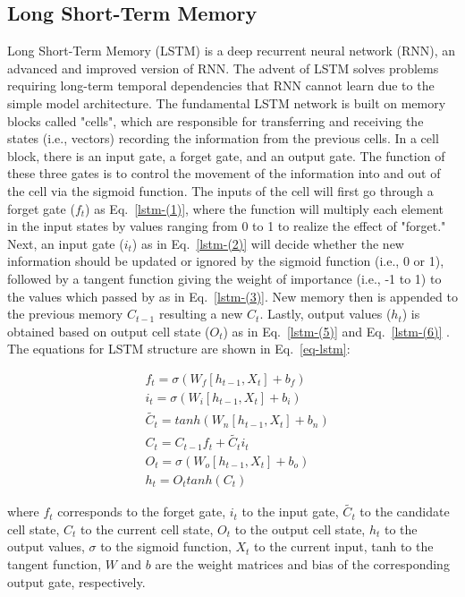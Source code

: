 \subsection{Long Short-Term Memory}
Long Short-Term Memory (LSTM) is a deep recurrent neural network (RNN), an advanced and improved version of RNN. The advent of LSTM solves problems requiring long-term temporal dependencies that RNN cannot learn due to the simple model architecture. The fundamental LSTM network is built on memory blocks called "cells", which are responsible for transferring and receiving the states (i.e., vectors) recording the information from the previous cells. In a cell block, there is an input gate, a forget gate, and an output gate. The function of these three gates is to control the movement of the information into and out of the cell via the sigmoid function. The inputs of the cell will first go through a forget gate ($f_t$) as Eq.~\ref{lstm-(1)}, where the function will multiply each element in the input states by values ranging from 0 to 1 to realize the effect of "forget." Next, an input gate ($i_t$) as in Eq.~\ref{lstm-(2)} will decide whether the new information should be updated or ignored by the sigmoid function (i.e., 0 or 1), followed by a tangent function giving the weight of importance (i.e., -1 to 1) to the values which passed by as in Eq.~\ref{lstm-(3)}. New memory then is appended to the previous memory $C_{t-1}$ resulting a new $C_t$. Lastly, output values ($h_t$) is obtained based on output cell state ($O_t$) as in Eq.~\ref{lstm-(5)} and Eq.~\ref{lstm-(6)} \citep{leApplicationLongShortTerm2019}. The equations for LSTM structure are shown in Eq.~\ref{eq-lstm}:

\begin{subequations} \label{eq-lstm}
  \begin{align}
      &f_t=\sigma(W_f[h_{t-1},X_t]+b_f) \label{lstm-(1)}\\
      &i_t=\sigma(W_i[h_{t-1},X_t]+b_i) \label{lstm-(2)}\\
      &\tilde{C_t}=tanh(W_n[h_{t-1},X_t]+b_n) \label{lstm-(3)}\\
      &C_t=C_{t-1}f_t+\tilde{C_t}i_t \label{lstm-(4)}\\
      &O_t=\sigma(W_o[h_{t-1},X_t]+b_o) \label{lstm-(5)}\\
      &h_t=O_ttanh(C_t) \label{lstm-(6)}
  \end{align}
\end{subequations}

\noindent
where $f_t$ corresponds to the forget gate, $i_t$ to the input gate, $\tilde{C_t}$ to the candidate cell state, $C_t$ to the current cell state, $O_t$ to the output cell state, $h_t$ to the output values, $\sigma$ to the sigmoid function, $X_t$ to the current input, tanh to the tangent function, $W$ and $b$ are the weight matrices and bias of the corresponding output gate, respectively.

